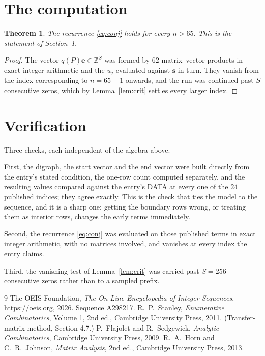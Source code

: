\documentclass[11pt,a4paper]{article}
\theoremstyle{plain}
\newtheorem{theorem}{Theorem}
\theoremstyle{definition}
\begin{document}
\section{The computation}

\begin{theorem}
The recurrence \eqref{eq:conj} holds for every $n>65$. This is the statement of
Section~1.
\end{theorem}

\begin{proof}
The vector $q(P)\mathbf{e}\in\mathbb{Z}^{S}$ was formed by $62$ matrix--vector
products in exact integer arithmetic and the $u_j$ evaluated against $\mathbf{s}$ in turn.
They vanish from the index corresponding to $n=65+1$ onwards, and the run was continued
past $S$ consecutive zeros, which by Lemma~\ref{lem:crit} settles every larger index.
\end{proof}

\section{Verification}

Three checks, each independent of the algebra above.

First, the digraph, the start vector and the end vector were built directly from the
entry's stated condition, the one-row count computed separately, and the resulting values
compared against the entry's DATA at every one of the $24$ published indices; they
agree exactly. This is the check that ties the model to the sequence, and it is a sharp one:
getting the boundary rows wrong, or treating them as interior rows, changes the early terms
immediately.

Second, the recurrence \eqref{eq:conj} was evaluated on those published terms in exact
integer arithmetic, with no matrices involved, and vanishes at every index the entry claims.

Third, the vanishing test of Lemma~\ref{lem:crit} was carried past $S=256$ consecutive
zeros rather than to a sampled prefix.

\begin{thebibliography}{9}
 The OEIS Foundation, \emph{The On-Line Encyclopedia of Integer
Sequences}, \url{https://oeis.org}, 2026. Sequence A298217.
 R.~P.~Stanley, \emph{Enumerative Combinatorics}, Volume 1, 2nd ed.,
Cambridge University Press, 2011. (Transfer-matrix method, Section 4.7.)
 P.~Flajolet and R.~Sedgewick, \emph{Analytic Combinatorics}, Cambridge
University Press, 2009.
 R.~A.~Horn and C.~R.~Johnson, \emph{Matrix Analysis}, 2nd ed., Cambridge
University Press, 2013.
\end{thebibliography}
\end{document}
